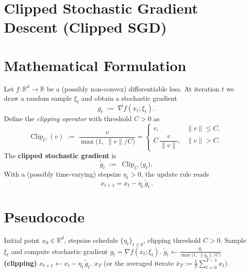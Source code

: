 \documentclass{article}
\begin{document}
\section*{Clipped Stochastic Gradient Descent (Clipped SGD)}

\section*{Mathematical Formulation}
Let $f:\mathbb{R}^{d}\to\mathbb{R}$ be a (possibly non‑convex) differentiable loss.  
At iteration $t$ we draw a random sample $\xi_t$ and obtain a stochastic gradient
\[
g_t \;:=\; \nabla f(x_t;\xi_t) .
\]
Define the \emph{clipping operator} with threshold $C>0$ as
\[
\operatorname{Clip}_C(v)\;:=\;
\frac{v}{\max\!\bigl(1,\; \|v\|/C\bigr)}=
\begin{cases}
v, & \|v\|\le C,\\[4pt]
C\,\dfrac{v}{\|v\|}, & \|v\|>C .
\end{cases}
\]
The \textbf{clipped stochastic gradient} is
\[
\tilde g_t \;:=\; \operatorname{Clip}_C\!\bigl(g_t\bigr).
\]
With a (possibly time‑varying) stepsize $\eta_t>0$, the update rule reads
\[
\boxed{\,x_{t+1}=x_t-\eta_t\,\tilde g_t\,}. \tag{1}
\]

\section*{Pseudocode}
\begin{algorithm}[H]
\caption{Clipped SGD}
\begin{algorithmic}[1]
\REQUIRE Initial point $x_0\in\mathbb{R}^d$, stepsize schedule $\{\eta_t\}_{t\ge0}$, clipping threshold $C>0$.
    \STATE Sample $\xi_t$ and compute stochastic gradient $g_t=\nabla f(x_t;\xi_t)$.
    \STATE $\displaystyle \tilde g_t \gets \frac{g_t}{\max\!\bigl(1,\;\|g_t\|/C\bigr)}$ \hfill\textbf{(clipping)}
    \STATE $x_{t+1} \gets x_t - \eta_t\,\tilde g_t$.
\ENDFOR
\RETURN $x_T$ (or the averaged iterate $\bar x_T:=\frac1T\sum_{t=0}^{T-1}x_t$).
\end{algorithmic}
\end{algorithm}
\end{document}
